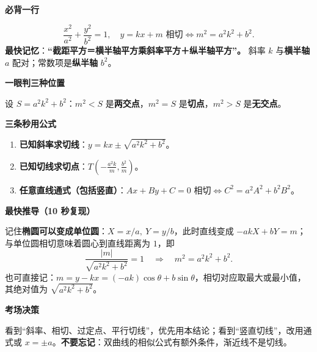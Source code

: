\begin{summarybox}
\textbf{必背一行}\par
\[
\boxed{\frac{x^2}{a^2}+\frac{y^2}{b^2}=1,\quad
 y=kx+m\text{ 相切}\iff m^2=a^2k^2+b^2.}
\]
\textbf{最快记忆}：\textbf{“截距平方＝横半轴平方乘斜率平方＋纵半轴平方”。} 斜率 $k$ 与\textbf{横半轴} $a$ 配对；常数项是\textbf{纵半轴} $b^2$。

\medskip
\textbf{一眼判三种位置}\par
设 $S=a^2k^2+b^2$：$m^2<S$ 是\textbf{两交点}，$m^2=S$ 是\textbf{切点}，$m^2>S$ 是\textbf{无交点}。

\medskip
\textbf{三条秒用公式}\par
\begin{enumerate}
    \item \textbf{已知斜率求切线}：$\displaystyle y=kx\pm\sqrt{a^2k^2+b^2}$。
    \item \textbf{已知切线求切点}：$\displaystyle T\left(-\frac{a^2k}{m},\frac{b^2}{m}\right)$。
    \item \textbf{任意直线通式（包括竖直）}：$\displaystyle Ax+By+C=0\text{ 相切}\iff\boxed{C^2=a^2A^2+b^2B^2}$。
\end{enumerate}

\textbf{最快推导（10 秒复现）}\par
记住\textbf{椭圆可以变成单位圆}：$X=x/a,\ Y=y/b$，此时直线变成 $-akX+bY=m$；与单位圆相切意味着圆心到直线距离为 $1$，即
\[
\frac{|m|}{\sqrt{a^2k^2+b^2}}=1
\quad\Longrightarrow\quad\boxed{m^2=a^2k^2+b^2}.
\]
也可直接记：$m=y-kx=(-ak)\cos\theta+b\sin\theta$，相切对应取最大或最小值，其绝对值为 $\sqrt{a^2k^2+b^2}$。

\medskip
\textbf{考场决策}\par
看到“斜率、相切、过定点、平行切线”，优先用本结论；看到“竖直切线”，改用通式或 $x=\pm a$。\textbf{不要忘记}：双曲线的相似公式有额外条件，渐近线不是切线。
\end{summarybox}

